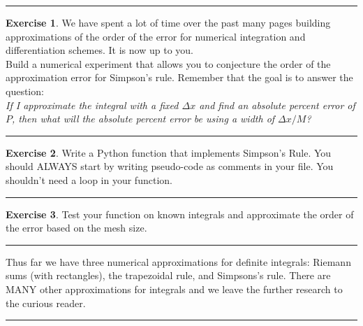 \documentclass[
]{book}
\theoremstyle{definition}
\theoremstyle{definition}
\theoremstyle{definition}
\newtheorem{exercise}{Exercise}[chapter]
\theoremstyle{remark}
\begin{document}
\begin{center}\rule{0.5\linewidth}{0.5pt}\end{center}

\begin{exercise}
\protect\hypertarget{exr:unnamed-chunk-185}{}{\label{exr:unnamed-chunk-185} }We have spent a lot of time over the past many pages building
approximations of the order of the error for numerical integration and
differentiation schemes. It is now up to you.\\
Build a numerical experiment that allows you to conjecture the order of
the approximation error for Simpson's rule. Remember that the goal is to
answer the question:\\
\emph{If I approximate the integral with a fixed \(\Delta x\) and find an absolute percent error of \(P\), then what will the absolute percent error be using a width of \(\Delta x / M\)?}
\end{exercise}

\begin{center}\rule{0.5\linewidth}{0.5pt}\end{center}

\begin{exercise}
\protect\hypertarget{exr:unnamed-chunk-186}{}{\label{exr:unnamed-chunk-186} }Write a Python function that implements Simpson's Rule. You should ALWAYS start by writing pseudo-code as comments in your file. You shouldn't need a loop in your function.
\end{exercise}

\begin{center}\rule{0.5\linewidth}{0.5pt}\end{center}

\begin{exercise}
\protect\hypertarget{exr:unnamed-chunk-187}{}{\label{exr:unnamed-chunk-187} }Test your function on known integrals and approximate the order of the error based on the mesh size.
\end{exercise}

\begin{center}\rule{0.5\linewidth}{0.5pt}\end{center}

Thus far we have three numerical approximations for definite integrals:
Riemann sums (with rectangles), the trapezoidal rule, and Simpsons's
rule. There are MANY other approximations for integrals and we leave the
further research to the curious reader.

\begin{center}\rule{0.5\linewidth}{0.5pt}\end{center}
\end{document}
